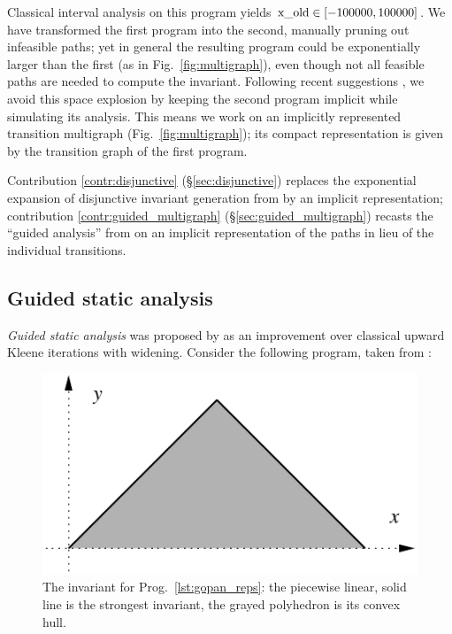 \documentclass[preprint]{sigplanconf}
\begin{document}
Classical interval analysis on this program yields $\lstinline|x_old| \in [-100000,100000]$.
We have transformed the first program into the second, manually pruning out infeasible paths; yet in general the resulting program could be exponentially larger than the first (as in Fig.~\ref{fig:multigraph}), even though not all feasible paths are needed to compute the invariant.
Following recent suggestions \cite{Gawlitza_Monniaux_ESOP11,Monniaux_Gonnord_SAS11}, we avoid this space explosion by keeping the second program implicit while simulating its analysis. This means we work on an implicitly represented transition multigraph (Fig.~\ref{fig:multigraph}); its compact representation is given by the transition graph of the first program.

Contribution \ref{contr:disjunctive} (\S\ref{sec:disjunctive}) replaces the exponential expansion of disjunctive invariant generation from \citet{DBLP:conf/pldi/GulwaniZ10} by an implicit representation;
contribution \ref{contr:guided_multigraph} (\S\ref{sec:guided_multigraph}) recasts the ``guided analysis'' from \citet{DBLP:conf/sas/GopanR07} on an implicit representation of the paths in lieu of the individual transitions.

\subsection{Guided static analysis}
\label{sec:guided}
\emph{Guided static analysis} was proposed by \citet{DBLP:conf/sas/GopanR07} as an improvement over classical upward Kleene iterations with widening.
Consider the following program, taken from \cite{DBLP:conf/sas/GopanR07}:


\begin{figure}
\begin{center}
\includegraphics[scale=0.75]{figures/gopan_reps}
\end{center}
\caption{The invariant for Prog.~\ref{lst:gopan_reps}: the piecewise linear, solid line is the strongest invariant, the grayed polyhedron is its convex hull.}
\label{fig:gopan_reps_invariant} 
\end{figure}
\end{document}
